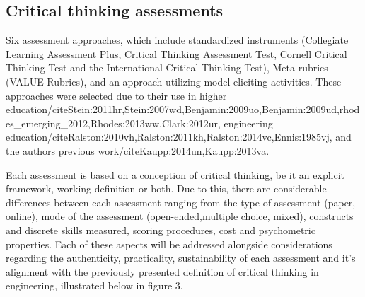 \subsection{Critical thinking assessments}

Six assessment approaches, which include standardized instruments (Collegiate Learning Assessment Plus, Critical Thinking Assessment Test, Cornell Critical Thinking Test and the International Critical Thinking Test), Meta-rubrics (VALUE Rubrics), and an approach utilizing model eliciting activities.  These approaches were selected due to their use in higher education/cite{Stein:2011hr,Stein:2007wd,Benjamin:2009uo,Benjamin:2009ud,rhodes_emerging_2012,Rhodes:2013ww,Clark:2012ur}, engineering education/cite{Ralston:2010vh,Ralston:2011kh,Ralston:2014vc,Ennis:1985vj}, and the authors previous work/cite{Kaupp:2014un,Kaupp:2013va}.



Each assessment is based on a conception of critical thinking, be it an explicit framework, working definition or both.  Due to this, there are considerable differences between each assessment ranging from the type of assessment (paper, online), mode of the assessment (open-ended,multiple choice, mixed), constructs and discrete skills measured, scoring procedures, cost and psychometric properties.  Each of these aspects will be addressed alongside considerations regarding the  authenticity, practicality, sustainability of each assessment and it's alignment with the previously presented definition of critical thinking in engineering, illustrated below in figure 3.
